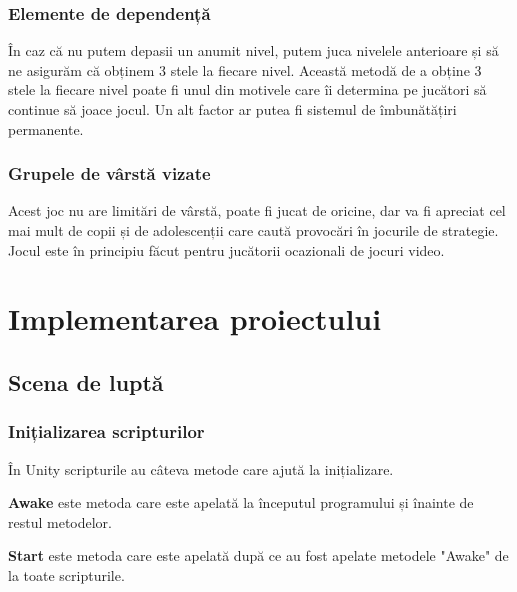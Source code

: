 \documentclass[12pt, a4paper]{article}
\begin{document}
	
	
	
	
	\subsubsection{Elemente de dependență}
	
	În caz că nu putem depasii un anumit nivel, putem juca nivelele anterioare și să ne asigurăm că obținem 3 stele la fiecare nivel. Această metodă de a obține 3 stele la fiecare nivel poate fi unul din motivele care îi determina pe jucători să continue să joace jocul. Un alt factor ar putea fi sistemul de îmbunătățiri permanente.
	
	
	
	
	
	\subsubsection{Grupele de vârstă vizate}
	
	Acest joc nu are limitări de vârstă, poate fi jucat de oricine, dar va fi apreciat cel mai mult de copii și de adolescenții care caută provocări în jocurile de strategie. Jocul este în principiu făcut pentru jucătorii ocazionali de jocuri video.
	
	
	
	
	
	\section{Implementarea proiectului}
	\label{section: projectImplementation}
	
	\subsection{Scena de luptă}
	
	\subsubsection{Inițializarea scripturilor}
	\label{section: initialization}
	
	În Unity scripturile au câteva metode care ajută la inițializare.
	\newline
	
	\textbf{Awake} este metoda care este apelată la începutul programului și înainte de restul metodelor.
	\newline
	
	\textbf{Start} este metoda care este apelată după ce au fost apelate metodele "Awake" de la toate scripturile.
	\newline
	
\end{document}
